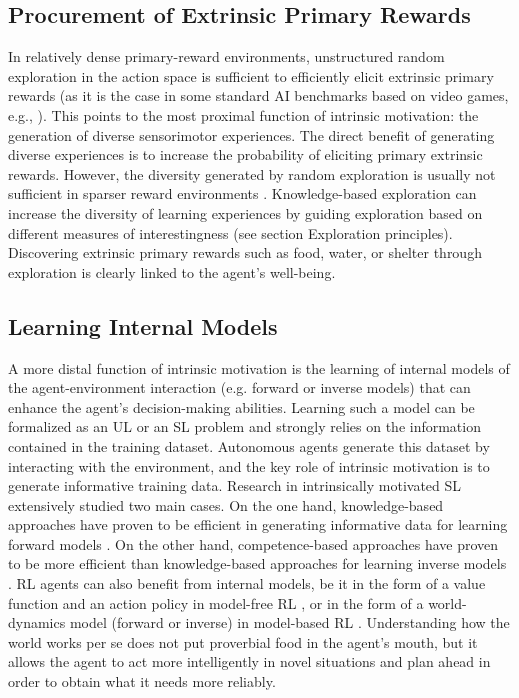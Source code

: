 \subsection{Procurement of Extrinsic Primary Rewards}\label{CH3_SS_procurement_of_extrinsic_primary_rewards}
In relatively dense primary-reward environments, unstructured random exploration in the action space is sufficient to efficiently elicit extrinsic primary rewards (as it is the case in some standard AI benchmarks based on video games, e.g., \cite{mnih_human-level_2015}). This points to the most proximal function of intrinsic motivation: the generation of diverse sensorimotor experiences. The direct benefit of generating diverse experiences is to increase the probability of eliciting primary extrinsic rewards. However, the diversity generated by random exploration is usually not sufficient in sparser reward environments \parencite[e.g.,][]{pathak_curiosity-driven_2017}. Knowledge-based exploration can increase the diversity of learning experiences by guiding exploration based on different measures of interestingness (see section Exploration principles). Discovering extrinsic primary rewards such as food, water, or shelter through exploration is clearly linked to the agent’s well-being.

\subsection{Learning Internal Models}\label{CH3_SS_learning_internal_models}
A more distal function of intrinsic motivation is the learning of internal models of the agent-environment interaction (e.g. forward or inverse models) that can enhance the agent’s decision-making abilities. Learning such a model can be formalized as an UL or an SL problem and strongly relies on the information contained in the training dataset. Autonomous agents generate this dataset by interacting with the environment, and the key role of intrinsic motivation is to generate informative training data. Research in intrinsically motivated SL extensively studied two main cases. On the one hand, knowledge-based approaches have proven to be efficient in generating informative data for learning forward models \parencite{oudeyer_intrinsic_2007}. On the other hand, competence-based approaches have proven to be more efficient than knowledge-based approaches for learning inverse models \parencite{baranes_active_2013}. RL agents can also benefit from internal models, be it in the form of a value function and an action policy in model-free RL \parencite{pathak_curiosity-driven_2017}, or in the form of a world-dynamics model (forward or inverse) in model-based RL \parencite{haber_learning_2018}. Understanding how the world works per se does not put proverbial food in the agent’s mouth, but it allows the agent to act more intelligently in novel situations and plan ahead in order to obtain what it needs more reliably.

